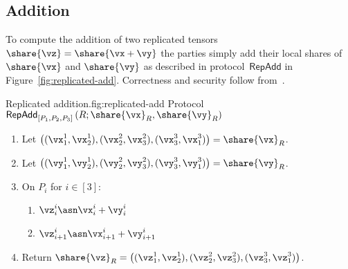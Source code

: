 \subsection{Addition}

To compute the addition of two replicated tensors $\share{\vz} = \share{\vx + \vy}$
the parties simply add their local shares of $\share{\vx}$ and $\share{\vy}$
as described in protocol~$\mathsf{RepAdd}$ in Figure~\ref{fig:replicated-add}.
Correctness and security follow from~\cite{CCS:ABFLNO16}.

\begin{Boxfig}{Replicated addition.}{fig:replicated-add}
  {Protocol $\mathsf{RepAdd}_{[P_1, P_2, P_3]}\left(R; \share{\vx}_R, \share{\vy}_R \right)$}
  
  \begin{enumerate}
  \item Let $\left( (\vx_1^1, \vx_2^1), (\vx_2^2, \vx_3^2), (\vx_3^3, \vx_1^3) \right) = \share{\vx}_R$.
  \item Let $\left( (\vy_1^1, \vy_2^1), (\vy_2^2, \vy_3^2), (\vy_3^3, \vy_1^3) \right) = \share{\vy}_R$.
  
  \item On $P_i$ for $i \in [3]$:
  \begin{enumerate}
    \item $\vz_i^i \asn \vx_i^i + \vy_i^i$
    \item $\vz_{i+1}^i \asn \vx_{i+1}^i + \vy_{i+1}^i$
  \end{enumerate}
  
  \item Return $\share{\vz}_R = \left( (\vz_1^1, \vz_2^1), (\vz_2^2, \vz_3^2), (\vz_3^3, \vz_1^3) \right)$.
  \end{enumerate}
\end{Boxfig}
